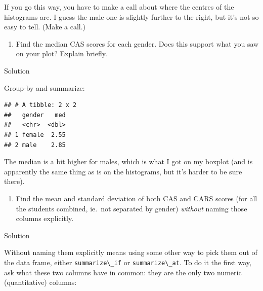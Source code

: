 \documentclass[]{tufte-book}
\newenvironment{Shaded}{}{}
\newcommand{\DataTypeTok}[1]{\textcolor[rgb]{0.56,0.13,0.00}{#1}}
\newcommand{\KeywordTok}[1]{\textcolor[rgb]{0.00,0.44,0.13}{\textbf{#1}}}
\newcommand{\NormalTok}[1]{#1}
\newcommand{\OperatorTok}[1]{\textcolor[rgb]{0.40,0.40,0.40}{#1}}
\newcommand{\StringTok}[1]{\textcolor[rgb]{0.25,0.44,0.63}{#1}}
\providecommand{\tightlist}{%
  \setlength{\itemsep}{0pt}\setlength{\parskip}{0pt}}
\theoremstyle{definition}
\theoremstyle{definition}
\theoremstyle{definition}
\theoremstyle{remark}
\begin{document}
If you go this way, you have to make a call about where the centres of
the histograms are. I guess the male one is slightly further to the
right, but it's not so easy to tell. (Make a call.)

\begin{enumerate}
\def\labelenumi{(\alph{enumi})}
\setcounter{enumi}{3}
\tightlist
\item
  Find the median CAS scores for each gender. Does this support what you
  saw on your plot? Explain briefly.
\end{enumerate}

Solution

Group-by and summarize:

\begin{Shaded}
\end{Shaded}

\begin{verbatim}
## # A tibble: 2 x 2
##   gender   med
##   <chr>  <dbl>
## 1 female  2.55
## 2 male    2.85
\end{verbatim}

The median is a bit higher for males, which is what I got on my boxplot
(and is apparently the same thing as is on the histograms, but it's
harder to be sure there).

\begin{enumerate}
\def\labelenumi{(\alph{enumi})}
\setcounter{enumi}{4}
\tightlist
\item
  Find the mean and standard deviation of both CAS and CARS scores (for
  all the students combined, ie.~not separated by gender) \emph{without}
  naming those columns explicitly.
\end{enumerate}

Solution

Without naming them explicitly means using some other way to pick them
out of the data frame, either \texttt{summarize\textbackslash{}\_if} or
\texttt{summarize\textbackslash{}\_at}. To do it the first way, ask what
these two columns have in common: they are the only two numeric
(quantitative) columns:

\begin{Shaded}
\end{Shaded}
\end{document}
